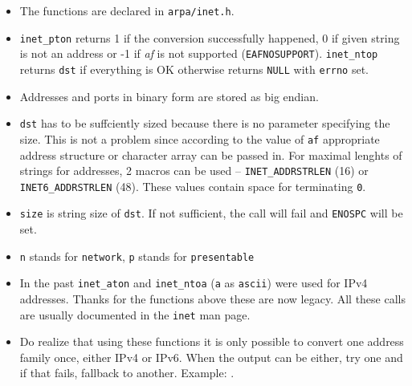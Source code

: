 \begin{itemize}
\item The functions are declared in \texttt{arpa/inet.h}.
\item \texttt{inet\_pton} returns 1 if the conversion successfully happened,
0 if given string is not an address or -1 if \emph{af} is not supported
(\texttt{EAFNOSUPPORT}). \texttt{inet\_ntop} returns \texttt{dst} if everything
is OK otherwise returns \texttt{NULL} with \texttt{errno} set.
\item Addresses and ports in binary form are stored as big endian.
\item \texttt{dst} has to be suffciently sized because there is no parameter
specifying the size. This is not a problem since according to the value of
\texttt{af} appropriate address structure or character array can be passed in.
For maximal lenghts of strings for addresses, 2 macros can be used --
\texttt{INET\_ADDRSTR\-LEN} (16) or \texttt{INET6\_ADDRSTRLEN} (48). 
These values contain space for terminating \texttt{\bs{}0}.
\item \texttt{size} is string size of \texttt{dst}. If not sufficient, the call
will fail and \texttt{ENOSPC} will be set.
\item \texttt{n} stands for \texttt{network}, \texttt{p} stands for
\texttt{presentable}
\item In the past \texttt{inet\_aton} and \texttt{inet\_ntoa} (\texttt{a} as
\texttt{ascii}) were used for IPv4 addresses. Thanks for the functions above
these are now legacy. All these calls are usually documented in the
\texttt{inet} man page.
\item \label{ADDRESSES} Do realize that using these functions it is only
possible to convert one address family once, either IPv4 or IPv6.
When the output can be either, try one and if that fails, fallback to another.
Example: .
\end{itemize}



